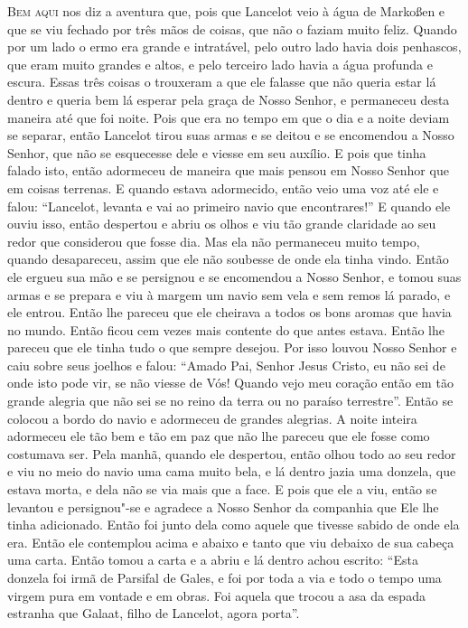 \textsc{Bem aqui} nos diz a aventura que, pois que Lancelot veio à água de Markoßen
e que se viu fechado por três mãos de coisas, que não o faziam muito feliz. 
Quando por um lado o ermo era grande e intratável, pelo outro lado havia
dois penhascos, que eram muito grandes e altos, e pelo terceiro lado havia a
água profunda e escura. Essas três coisas o trouxeram a que ele falasse que não
queria estar lá dentro e queria bem lá esperar pela graça de Nosso Senhor, e
permaneceu desta maneira até que foi noite. Pois que era no tempo em que o dia
e a noite deviam se separar, então Lancelot tirou suas armas e se deitou e se
encomendou a Nosso Senhor, que não se esquecesse dele e viesse em seu auxílio.
E pois que tinha falado isto, então adormeceu de maneira que mais pensou em
Nosso Senhor que em coisas terrenas. E quando estava adormecido, então veio uma
voz até ele e falou: “Lancelot, levanta e vai ao primeiro navio que
encontrares!” E quando ele ouviu isso, então despertou e abriu os
olhos e viu tão grande claridade ao seu redor que considerou que fosse dia. Mas ela
não permaneceu muito tempo, quando desapareceu, assim que ele não soubesse de
onde ela tinha vindo. Então ele ergueu sua mão e se persignou e se encomendou
a Nosso Senhor, e tomou suas armas e se prepara e viu à margem um navio sem
vela e sem remos lá parado, e ele entrou. Então lhe pareceu que ele cheirava a
todos os bons aromas que havia no mundo. Então ficou cem vezes mais contente do
que antes estava. Então lhe pareceu que ele tinha tudo o que sempre desejou.
Por isso louvou Nosso Senhor e caiu sobre seus joelhos e falou: “Amado Pai,
Senhor Jesus Cristo, eu não sei de onde isto pode vir, se não viesse de Vós!
Quando vejo meu coração então em tão grande alegria que não sei se no reino da
terra ou no paraíso terrestre”. Então se colocou a bordo do navio e adormeceu
de grandes alegrias. A noite inteira adormeceu ele tão bem e tão em paz que não
lhe pareceu que ele fosse como costumava ser. Pela manhã, quando ele despertou,
então olhou todo ao seu redor e viu no meio do navio uma cama muito bela, e lá
dentro jazia uma donzela, que estava morta, e dela não se via mais que a face.
E pois que ele a viu, então se levantou e persignou"-se e agradece a Nosso
Senhor da companhia que Ele lhe tinha adicionado. Então foi junto dela como
aquele que tivesse sabido de onde ela era. Então ele contemplou acima e abaixo
e tanto que viu debaixo de sua cabeça uma carta. Então tomou a carta e a abriu
e lá dentro achou escrito: “Esta donzela foi irmã de Parsifal de Gales, e foi
por toda a via e todo o tempo uma virgem pura em vontade e em obras. Foi aquela
que trocou a asa da espada estranha que Galaat, filho de Lancelot, agora
porta”.

